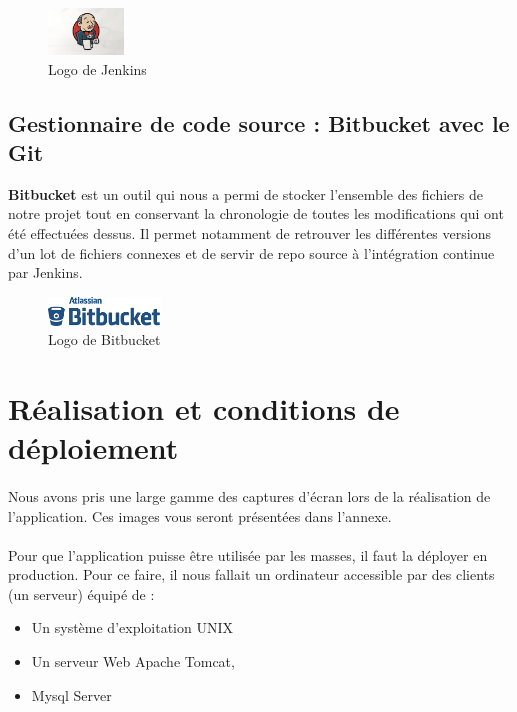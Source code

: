 \documentclass[12pt]{report}
\begin{document}
	  \begin{figure}[H]
	    \begin{center}
	      \includegraphics[scale=0.4, width=2cm]{images/logoJenkins.jpg}
	      \caption{Logo de Jenkins}
	    \end{center}
	  \end{figure}
	    
	  \subsection{Gestionnaire de code source : Bitbucket avec le Git}
	  \textbf{Bitbucket} est un outil qui nous a permi de stocker l'ensemble des fichiers de notre projet tout en conservant la chronologie de toutes les modifications qui ont été effectuées dessus. Il permet notamment de retrouver les différentes versions d'un lot de fichiers connexes et de servir de repo source à l'intégration continue par Jenkins.
	  
	  \begin{figure}[H]
	    \begin{center}
	      \includegraphics[scale=0.4, width=3cm]{images/logoBitbucket.png}
	      \caption{Logo de Bitbucket}
	    \end{center}
	  \end{figure}
	  
      \section{Réalisation et conditions de déploiement}
	\paragraph{}
	  Nous avons pris une large gamme des captures d'écran lors de la réalisation de l'application. Ces images vous seront présentées dans l'annexe.
	
	\paragraph{}
	  Pour que l'application puisse être utilisée par les masses, il faut la déployer en production. Pour ce faire, il nous fallait un ordinateur accessible par des clients (un serveur) équipé de :
	    \begin{itemize}
	      \item Un système d'exploitation UNIX
	      \item Un serveur Web Apache Tomcat,
	      \item Mysql Server
	    \end{itemize}
	  
\end{document}
